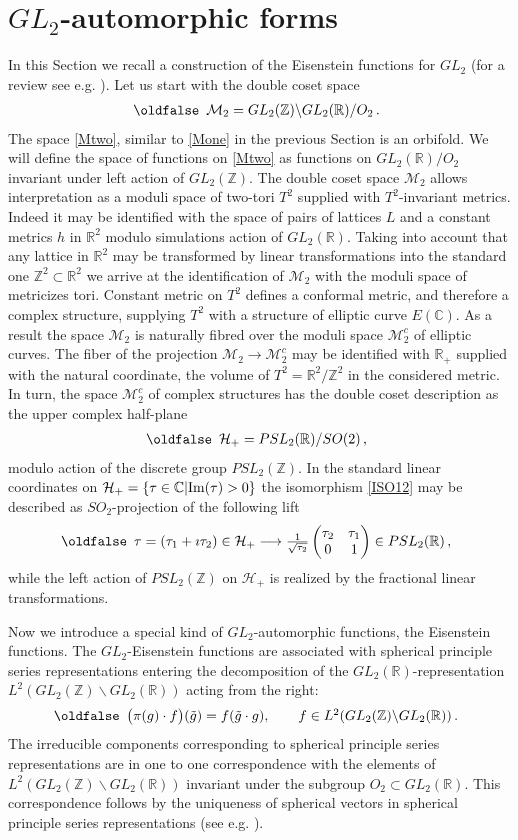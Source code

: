 \documentclass[12pt]{article}
\def\IC{\mathbb{C}}
\def\IR{\mathbb{R}}
\def\IZ{\mathbb{Z}}
\def\CH {\mathcal{H}}
\def\CM {\mathcal{M}}
\def\be{\begin{eqnarray}\new\begin{array}{cc}}
\def\ee{\end{array}\end{eqnarray}}
\newcounter{pac}[section]
\begin{document}
\section{$GL_2$-automorphic forms }

In this Section we recall a  construction of the Eisenstein functions
for $GL_2$ (for a review see e.g. \cite{ILP}).
Let us start with  the  double coset space
\be\label{Mtwo}
\CM_2=GL_2(\IZ)\backslash GL_2(\IR)/O_2\,.
\ee
The space \eqref{Mtwo}, similar to  \eqref{Mone} in the previous Section
 is an orbifold. We will define the space of functions on
\eqref{Mtwo} as functions on $GL_2(\IR)/O_2$ invariant under left
action of $GL_2(\IZ)$. The double coset space  $\CM_2$ allows
interpretation as a moduli space of two-tori $T^2$ supplied with
$T^2$-invariant metrics. Indeed it may  be identified with the space
of pairs of lattices $L$   and a constant metrics $h$ in $\IR^2$
modulo simulations action of $GL_2(\IR)$. Taking into account that
any lattice in $\IR^2$ may be transformed by linear transformations
into the standard one $\IZ^2\subset \IR^2$ we arrive at the
identification of  $\CM_2$ with the moduli space of metricizes tori.
Constant metric on $T^2$ defines a conformal metric, and therefore a
complex structure, supplying $T^2$ with a structure of elliptic
curve $E(\IC)$. As a result the space $\CM_2$ is naturally fibred
over the moduli space $\CM_2^c$ of elliptic curves. The fiber of the
projection $\CM_2\to \CM_2^c$ may be identified  with $\IR_+$
supplied with the natural coordinate, the volume of
$T^2=\IR^2/\IZ^2$ in the considered metric. In turn, the space
$\CM_2^c$ of complex structures  has the double coset description as
the upper complex half-plane \be\label{ISO12}
\CH_+=PSL_2(\IR)/SO(2)\,, \ee modulo action of the discrete group
$PSL_2(\IZ)$. In the standard linear coordinates on $\CH_+=\{\tau\in
\IC|{\rm
  Im}(\tau)>0\}$ the isomorphism \eqref{ISO12}
may be described as  $SO_2$-projection of the following lift
 \be
  \tau=(\tau_1+\imath \tau_2)\in\CH_+ \longrightarrow
  \frac{1}{\sqrt{\tau_2}}
  \begin{pmatrix}  \tau_2 & \tau_1 \\ 0 & 1\end{pmatrix}\in
  PSL_2(\IR)\,,
 \ee
while the left action of $PSL_2(\IZ)$ on $\CH_+$ is realized by  the
fractional linear transformations.

Now we introduce a special kind of $GL_2$-automorphic functions,
the Eisenstein functions. The $GL_2$-Eisenstein functions are
associated with  spherical principle
series representations entering  the
decomposition of the $GL_2(\IR)$-representation $L^2(GL_2(\IZ)\backslash GL_2(\IR))$
acting from the right:
 \be
  \bigl(\pi(g)\cdot f\bigr)(\tilde{g})=f(\tilde{g}\cdot g),\qquad f\in
  L^2(GL_2(\IZ)\backslash GL_2(\IR))\,.
 \ee
The irreducible components
corresponding to spherical principle series representations are in one
to one correspondence with the elements of
$L^2(GL_2(\IZ)\backslash GL_2(\IR))$ invariant under the subgroup
$O_2\subset GL_2(\IR)$.  This  correspondence   follows by  the uniqueness of
spherical vectors in spherical principle series
representations (see e.g. \cite{GGPS}).
\end{document}
